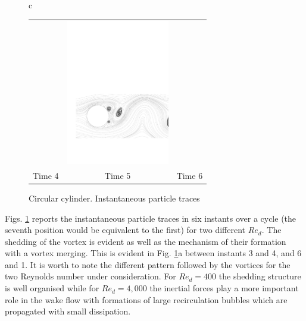 \begin{figure}[ht]
\begin{center}
\begin{tabular}{c}
{\begin{tabular}{ccc}
         &
         \includegraphics[width=45mm,clip=t]{CHAP_NONLIN/FIGURE/cim1.pdf}
        \\
         Time 4 & Time 5 & Time 6
       \end{tabular}}
  \end{tabular}
 \end{center}
 \vspace{-5mm}
 \caption{Circular cylinder. Instantaneous particle traces}
 \label{cil_sol1.fig}
\end{figure}
%

 Figs. \ref{cil_sol1.fig} reports the instantaneous
 particle traces in six instants over a cycle (the seventh position would be
 equivalent to the first) for two different $Re_d$.
 The shedding of the vortex is evident as well as the mechanism of their formation
 with a vortex merging. This is evident in Fig. \ref{cil_sol1.fig}a between instants
 3 and 4, and 6 and 1.
 It is worth to note the different pattern followed by the vortices for the two
 Reynolds number under consideration. For $Re_d= 400$ the
 shedding structure is well organised while for $Re_d= 4,000$
 the inertial forces play a more important role in the wake flow with formations
 of large recirculation bubbles which are propagated with small dissipation.
%
